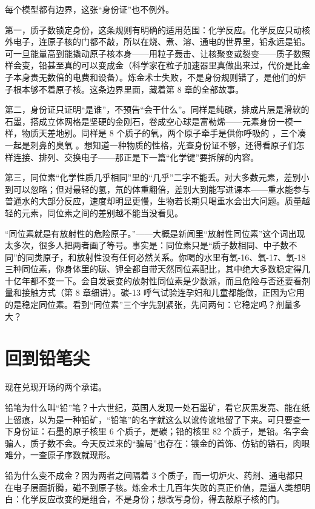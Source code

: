 每个模型都有边界，这张“身份证”也不例外。

第一，质子数锁定身份，这条规则有明确的适用范围：化学反应。化学反应只动核外电子，连原子核的门都不敲，所以在烧、煮、溶、通电的世界里，铅永远是铅。可一旦能量高到能撬动原子核本身——用粒子轰击、让核聚变或裂变——质子数照样会变，铅甚至真的可以变成金（科学家在粒子加速器里真做出来过，代价是比金子本身贵无数倍的电费和设备）。炼金术士失败，不是身份规则错了，是他们的炉子根本够不着原子核。这条边界里面，藏着第 8 章的全部故事。

第二，身份证只证明“是谁”，不预告“会干什么”。同样是纯碳，排成片层是滑软的石墨，搭成立体网格是坚硬的金刚石，卷成空心球是富勒烯——元素身份一模一样，物质天差地别。同样是 8 个质子的氧，两个原子牵手是供你呼吸的 ，三个凑一起是刺鼻的臭氧 。想知道一种物质的性格，光查身份证不够，还得看原子们怎样连接、排列、交换电子——那正是下一篇“化学键”要拆解的内容。

第三，同位素“化学性质几乎相同”里的“几乎”二字不能丢。对大多数元素，差别小到可以忽略；但对最轻的氢，氘的体重翻倍，差别大到能写进课本——重水能参与普通水的大部分反应，速度却明显更慢，生物若长期只喝重水会出大问题。质量越轻的元素，同位素之间的差别越不能当没看见。

\begin{wuqu}
“同位素就是有放射性的危险原子。”——大概是新闻里“放射性同位素”这个词出现太多次，很多人把两者画了等号。事实是：同位素只是“质子数相同、中子数不同”的同类原子，和放射性没有任何必然关系。你喝的水里有氧-16、氧-17、氧-18 三种同位素，你身体里的碳、钾全都自带天然同位素配比，其中绝大多数稳定得几十亿年都不变一下。会自发衰变的放射性同位素是少数派，而且危险与否还要看剂量和接触方式（第 8 章细讲）。碳-13 呼气试验连孕妇和儿童都能做，正因为它用的是稳定同位素。看到“同位素”三个字先别紧张，先问两句：它稳定吗？剂量多大？
\end{wuqu}

\section{回到铅笔尖}

现在兑现开场的两个承诺。

铅笔为什么叫“铅”笔？十六世纪，英国人发现一处石墨矿，看它灰黑发亮、能在纸上留痕，以为是一种铅矿，“铅笔”的名字就这么以讹传讹地留了下来。可只要查一下身份证：石墨的原子核里 6 个质子，是碳；铅的核里 82 个质子，是铅。名字会骗人，质子数不会。今天反过来的“骗局”也存在：镀金的首饰、仿钻的锆石，肉眼难分，一查原子序数就现形。

铅为什么变不成金？因为两者之间隔着 3 个质子，而一切炉火、药剂、通电都只在电子层面折腾，碰不到原子核。炼金术士几百年失败的真正价值，是逼人类想明白：化学反应改变的是组合，不是身份；想改写身份，得去敲原子核的门。

